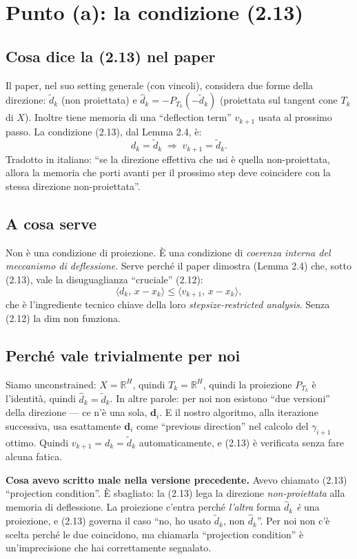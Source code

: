 \documentclass[11pt,a4paper]{article}
\newcommand{\R}{\mathbb{R}}
\newcommand{\inner}[2]{\langle #1,\,#2\rangle}
\newcommand{\bd}{\mathbf{d}}
\theoremstyle{definition}
\begin{document}
\section{Punto (a): la condizione (2.13)}

\subsection*{Cosa dice la (2.13) nel paper}

Il paper, nel suo setting generale (con vincoli), considera due forme della direzione: $\tilde d_k$ (non proiettata) e $\hat d_k = -P_{T_k}(-\tilde d_k)$ (proiettata sul tangent cone $T_k$ di $X$). Inoltre tiene memoria di una ``deflection term'' $v_{k+1}$ usata al prossimo passo. La condizione (2.13), dal Lemma 2.4, è:
\[
d_k = \tilde d_k \;\Rightarrow\; v_{k+1} = \tilde d_k.
\]
Tradotto in italiano: ``se la direzione effettiva che usi è quella non-proiettata, allora la memoria che porti avanti per il prossimo step deve coincidere con la stessa direzione non-proiettata''.

\subsection*{A cosa serve}

Non è una condizione di proiezione. È una condizione di \emph{coerenza interna del meccanismo di deflessione}. Serve perché il paper dimostra (Lemma 2.4) che, sotto (2.13), vale la disuguaglianza ``cruciale'' (2.12):
\[
\inner{d_k}{x-x_k} \le \inner{v_{k+1}}{x-x_k},
\]
che è l'ingrediente tecnico chiave della loro \emph{stepsize-restricted analysis}. Senza (2.12) la dim non funziona.

\subsection*{Perché vale trivialmente per noi}

Siamo unconstrained: $X = \R^H$, quindi $T_k = \R^H$, quindi la proiezione $P_{T_k}$ è l'identità, quindi $\hat d_k = \tilde d_k$. In altre parole: per noi non esistono ``due versioni'' della direzione --- ce n'è una sola, $\bd_i$. E il nostro algoritmo, alla iterazione successiva, usa esattamente $\bd_i$ come ``previous direction'' nel calcolo del $\gamma_{i+1}$ ottimo. Quindi $v_{k+1} = d_k = \tilde d_k$ automaticamente, e (2.13) è verificata senza fare alcuna fatica.

\begin{tcolorbox}[warning]
\textbf{Cosa avevo scritto male nella versione precedente.} Avevo chiamato (2.13) ``projection condition''. È sbagliato: la (2.13) lega la direzione \emph{non-proiettata} alla memoria di deflessione. La proiezione c'entra perché \emph{l'altra} forma $\hat d_k$ \emph{è} una proiezione, e (2.13) governa il caso ``no, ho usato $\tilde d_k$, non $\hat d_k$''. Per noi non c'è scelta perché le due coincidono, ma chiamarla ``projection condition'' è un'imprecisione che hai correttamente segnalato.
\end{tcolorbox}
\end{document}
